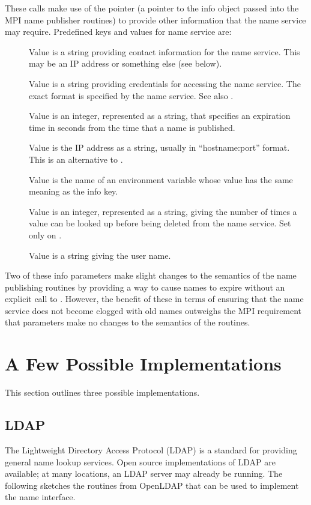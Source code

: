 \documentclass{article}
\begin{document}
These calls make use of the  pointer (a pointer to the
info object passed into the MPI name publisher routines) to provide other
information that the name service may require.
Predefined  keys and values for name service are:
\begin{description}
\item[]Value is a string providing contact
  information for the name service.  This may be an IP address or
  something else (see below).
\item[]Value is a string providing
  credentials for accessing the name service.  The exact format is
  specified by the name service.  See also .
\item[]Value is an integer, represented as a
  string, that specifies an expiration time in seconds from the time
  that a name is published.
\item[]Value is the IP address as a string, usually
  in ``hostname:port'' format.  This is an alternative to
  . 
\item[]Value is the name of an environment
  variable whose value has the same meaning as the 
  info key. 
\item[]Value is an integer, represented as a
  string, giving the number of times a value can
  be looked up before being deleted from the name service.  Set only
  on .
\item[]Value is a string giving the user name.
\end{description}
Two of these info parameters make slight changes to the semantics of
the name publishing routines by providing a way to cause names to
expire without an explicit call to .
However, the benefit of these in terms of ensuring that the name
service does not become clogged with old names outweighs the MPI
requirement that  parameters make no changes to the
semantics of the routines.  

\section{A Few Possible Implementations}
\label{sec:sample-impls}
This section outlines three possible implementations.

\subsection{LDAP}
\label{sec:namepub-ldap}
The Lightweight Directory Access Protocol (LDAP) \cite{ldap} is a
standard for providing general name lookup services.  Open source
implementations of LDAP are available; at many locations, an LDAP
server may already be running.  The following sketches the routines
from OpenLDAP that can be used to implement the name interface.
\end{document}

